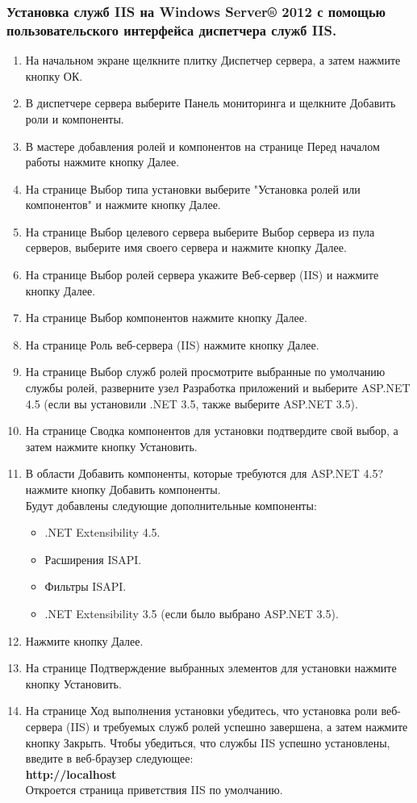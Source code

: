 \documentclass[12pt,a4paper,titlepage]{article}
\begin{document}
\subsubsection{Установка служб IIS на Windows Server® 2012 с помощью пользовательского интерфейса диспетчера служб IIS.}
\begin{enumerate}
\item На начальном экране щелкните плитку Диспетчер сервера, а затем нажмите кнопку ОК.
\item В диспетчере сервера выберите Панель мониторинга и щелкните Добавить роли и компоненты.
\item В мастере добавления ролей и компонентов на странице Перед началом работы нажмите кнопку Далее.
\item На странице Выбор типа установки выберите "Установка ролей или компонентов" и нажмите кнопку Далее.
\item На странице Выбор целевого сервера выберите Выбор сервера из пула серверов, выберите имя своего сервера и нажмите кнопку Далее.
\item На странице Выбор ролей сервера укажите Веб-сервер (IIS) и нажмите кнопку Далее.
\item На странице Выбор компонентов нажмите кнопку Далее.
\item На странице Роль веб-сервера (IIS) нажмите кнопку Далее.
\item На странице Выбор служб ролей просмотрите выбранные по умолчанию службы ролей, разверните узел Разработка приложений и выберите ASP.NET 4.5 (если вы установили .NET 3.5, также выберите ASP.NET 3.5).
\item На странице Сводка компонентов для установки подтвердите свой выбор, а затем нажмите кнопку Установить.
\item В области Добавить компоненты, которые требуются для ASP.NET 4.5? нажмите кнопку Добавить компоненты.\\Будут добавлены следующие дополнительные компоненты:
	\begin{itemize}
		\item .NET Extensibility 4.5.
		\item Расширения ISAPI.
		\item Фильтры ISAPI.
		\item .NET Extensibility 3.5 (если было выбрано ASP.NET 3.5).
	\end{itemize}
\item Нажмите кнопку Далее.
\item На странице Подтверждение выбранных элементов для установки нажмите кнопку Установить.
\item На странице Ход выполнения установки убедитесь, что установка роли веб-сервера (IIS) и требуемых служб ролей успешно завершена, а затем нажмите кнопку Закрыть.
Чтобы убедиться, что службы IIS успешно установлены, введите в веб-браузер следующее:
\\\textbf{http://localhost}\\
Откроется страница приветствия IIS по умолчанию.
\end{enumerate}
\end{document}
